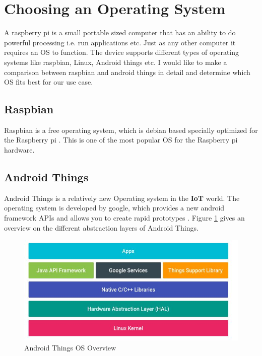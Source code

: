 \section{Choosing an Operating System}
        A raspberry pi is a small portable sized computer that has an ability to
        do powerful processing i.e. run applications etc. Just as any other computer
        it requires an OS to function. The device supports different
        types of operating systems like raspbian, Linux, Android things etc. I would like to 
        make a comparison between raspbian and android things in detail 
        and determine which OS fits best for our use case.

        \subsection{Raspbian}
            Raspbian is a free operating system, which is debian based specially optimized 
            for the Raspberry pi \cite{raspbien}. This is one of the most popular OS for
            the Raspberry pi hardware. 

        \subsection{Android Things}
            Android Things is a relatively new Operating system in the \textbf{IoT} 
            \cite{IoT} world. The operating system is developed by google, 
            which provides a new android framework APIs and allows you 
            to create rapid prototypes \cite{androidThings}. Figure 
            \ref{fig:aThingsOverview} gives an overview on the different 
            abstraction layers of Android Things. 
            \begin{figure}[htbp!]
                \centering \includegraphics{grafiken/androidThingsOverview.jpg}
                \caption{Android Things OS Overview}
                \label{fig:aThingsOverview}
            \end{figure}
    
